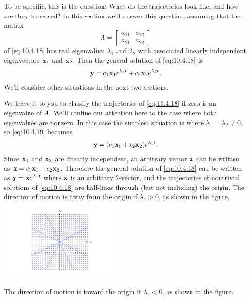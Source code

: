 \documentclass{ximera}
\begin{document}
To be specific, this is the question: What do the trajectories look
like, and how are they traversed? In this section we'll answer this
question, assuming that the matrix
$$
A=\begin{bmatrix}a_{11}&a_{12}\\a_{21}&a_{22}
\end{bmatrix}
$$
of \eqref{eq:10.4.18} has real eigenvalues $\lambda_1$ and $\lambda_2$ with
associated linearly independent eigenvectors ${\bf x}_1$ and ${\bf
x}_2$. Then  the general solution of \eqref{eq:10.4.18} is
\begin{equation} \label{eq:10.4.19}
{\bf y}= c_1{\bf x}_1
 e^{\lambda_1 t}+c_2{\bf x}_2e^{\lambda_2 t}.
\end{equation}
We'll consider other situations in the next two sections.

We leave it to you %
to classify the
trajectories of \eqref{eq:10.4.18} if zero is an eigenvalue of $A$. We'll
confine our attention here to the case where both eigenvalues are
nonzero. In this case the simplest situation is where
$\lambda_1=\lambda_2\neq 0$, so  \eqref{eq:10.4.19} becomes
$$
{\bf y}=(c_1{\bf x}_1+c_2{\bf x}_2)e^{\lambda_1 t}.
$$
Since ${\bf x}_1$ and
${\bf x}_2$ are linearly independent, an arbitrary vector ${\bf x}$
can be written as ${\bf x}=c_1{\bf x}_1+c_2{\bf x}_2$. Therefore the
general solution of \eqref{eq:10.4.18} can be written as ${\bf y}={\bf
x}e^{\lambda_1 t}$ where ${\bf x}$ is an arbitrary $2$-vector, and the
trajectories of nontrivial solutions of \eqref{eq:10.4.18} are half-lines
through (but not including) the origin. The direction of motion is
away from the origin if $\lambda_1>0$, as shown in the figure.

\begin{image}
 \includegraphics[height=1.5in]{fig100401.jpg} 
\end{image}


The direction of motion is toward the origin if $\lambda_1<0$, as shown in the figure. 
\end{document}
